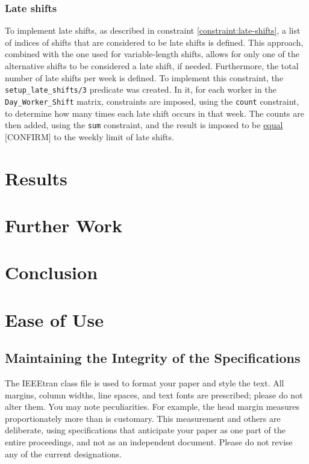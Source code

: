 \documentclass[conference]{IEEEtran}
\def\CONFIRM#1{\underline{#1} {\color{red}[CONFIRM]\color{black}}}
\begin{document}
\subsubsection*{Late shifts}

To implement late shifts, as described in constraint \ref{constraint:late-shifts}, a list of indices of shifts that are considered to be late shifts is defined. This approach, combined with the one used for variable-length shifts, allows for only one of the alternative shifts to be considered a late shift, if needed. Furthermore, the total number of late shifts per week is defined.
To implement this constraint, the \texttt{setup\_late\_shifts/3} predicate was created. In it, for each worker in the \texttt{Day\_Worker\_Shift} matrix, constraints are imposed, using the \texttt{count} constraint, to determine how many times each late shift occurs in that week. The counts are then added, using the \texttt{sum} constraint, and the result is imposed to be \CONFIRM{equal} to the weekly limit of late shifts.

\section{Results}
\label{section:results}

\section{Further Work}
\label{section:further-work}

\section{Conclusion}
\label{section:conclusion}

\color{red}
\section{Ease of Use}

\subsection{Maintaining the Integrity of the Specifications}

The IEEEtran class file is used to format your paper and style the text. All margins, 
column widths, line spaces, and text fonts are prescribed; please do not 
alter them. You may note peculiarities. For example, the head margin
measures proportionately more than is customary. This measurement 
and others are deliberate, using specifications that anticipate your paper 
as one part of the entire proceedings, and not as an independent document. 
Please do not revise any of the current designations.
\end{document}
